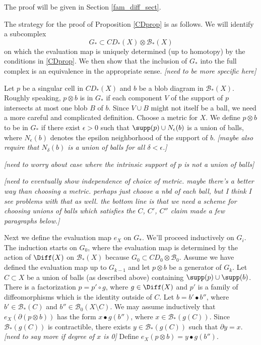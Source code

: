 \documentclass[11pt,leqno]{amsart}
\def\bc{{\mathcal B}}
\def\bd{\partial}
\def\sub{\subset}
\def\setmin{\setminus}
\def\nn#1{{{\it \small [#1]}}}
\begin{document}
The proof will be given in Section \ref{fam_diff_sect}.

\medskip

The strategy for the proof of Proposition \ref{CDprop} is as follows.
We will identify a subcomplex
\[
    G_* \sub CD_*(X) \otimes \bc_*(X)
\]
on which the evaluation map is uniquely determined (up to homotopy) by the conditions
in \ref{CDprop}.
We then show that the inclusion of $G_*$ into the full complex
is an equivalence in the appropriate sense.
\nn{need to be more specific here}

Let $p$ be a singular cell in $CD_*(X)$ and $b$ be a blob diagram in $\bc_*(X)$.
Roughly speaking, $p\otimes b$ is in $G_*$ if each component $V$ of the support of $p$
intersects at most one blob $B$ of $b$.
Since $V \cup B$ might not itself be a ball, we need a more careful and complicated definition.
Choose a metric for $X$.
We define $p\otimes b$ to be in $G_*$ if there exist $\epsilon > 0$ such that
$\supp(p) \cup N_\epsilon(b)$ is a union of balls, where $N_\epsilon(b)$ denotes the epsilon
neighborhood of the support of $b$.
\nn{maybe also require that $N_\delta(b)$ is a union of balls for all $\delta<\epsilon$.}

\nn{need to worry about case where the intrinsic support of $p$ is not a union of balls}

\nn{need to eventually show independence of choice of metric.  maybe there's a better way than
choosing a metric.  perhaps just choose a nbd of each ball, but I think I see problems
with that as well.
the bottom line is that we need a scheme for choosing unions of balls
which satisfies the $C$, $C'$, $C''$ claim made a few paragraphs below.}

Next we define the evaluation map $e_X$ on $G_*$.
We'll proceed inductively on $G_i$.
The induction starts on $G_0$, where the evaluation map is determined
by the action of $\Diff(X)$ on $\bc_*(X)$
because $G_0 \sub CD_0\otimes \bc_0$.
Assume we have defined the evaluation map up to $G_{k-1}$ and
let $p\otimes b$ be a generator of $G_k$.
Let $C \sub X$ be a union of balls (as described above) containing $\supp(p)\cup\supp(b)$.
There is a factorization $p = p' \circ g$, where $g\in \Diff(X)$ and $p'$ is a family of diffeomorphisms which is the identity outside of $C$.
Let $b = b'\bullet b''$, where $b' \in \bc_*(C)$ and $b'' \in \bc_0(X\setmin C)$.
We may assume inductively  that $e_X(\bd(p\otimes b))$ has the form $x\bullet g(b'')$, where
$x \in \bc_*(g(C))$.
Since $\bc_*(g(C))$ is contractible, there exists $y \in \bc_*(g(C))$ such that $\bd y = x$.
\nn{need to say more if degree of $x$ is 0}
Define $e_X(p\otimes b) = y\bullet g(b'')$.
\end{document}
